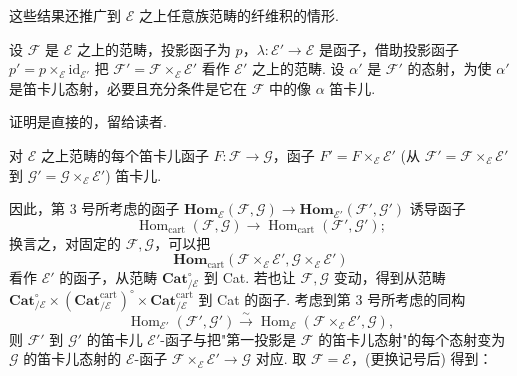 这些结果还推广到 $\mathcal{E}$ 之上任意族范畴的纤维积的情形.

\begin{proposition}\label{prop:VI.6.6}
设 $\mathcal{F}$ 是 $\mathcal{E}$ 之上的范畴，投影函子为 $p$，$\lambda \colon \mathcal{E}' \to \mathcal{E}$ 是函子，借助投影函子 $p' = p \times_{\mathcal{E}} \mathrm{id}_{\mathcal{E}'}$ 把 $\mathcal{F}' = \mathcal{F} \times_{\mathcal{E}} \mathcal{E}'$ 看作 $\mathcal{E}'$ 之上的范畴. 设 $\alpha'$ 是 $\mathcal{F}'$ 的态射，为使 $\alpha'$ 是笛卡儿态射，必要且充分条件是它在 $\mathcal{F}$ 中的像 $\alpha$ 笛卡儿.
\end{proposition}

证明是直接的，留给读者.

\begin{corollary}\label{cor:VI.6.7}
对 $\mathcal{E}$ 之上范畴的每个笛卡儿函子 $F \colon \mathcal{F} \to \mathcal{G}$，函子 $F' = F \times_{\mathcal{E}} \mathcal{E}'$ (从 $\mathcal{F}' = \mathcal{F} \times_{\mathcal{E}} \mathcal{E}'$ 到 $\mathcal{G}' = \mathcal{G} \times_{\mathcal{E}} \mathcal{E}'$) 笛卡儿.
\end{corollary}

因此，第 3 号所考虑的函子 $\mathbf{Hom}_{\mathcal{E}}(\mathcal{F}, \mathcal{G}) \to \mathbf{Hom}_{\mathcal{E}'}(\mathcal{F}', \mathcal{G}')$ 诱导函子
\[
\operatorname{Hom}_{\mathrm{cart}}(\mathcal{F}, \mathcal{G}) \longrightarrow \operatorname{Hom}_{\mathrm{cart}}(\mathcal{F}', \mathcal{G}');
\]
换言之，对固定的 $\mathcal{F}, \mathcal{G}$，可以把
\[
\mathbf{Hom}_{\mathrm{cart}}(\mathcal{F} \times_{\mathcal{E}} \mathcal{E}', \mathcal{G} \times_{\mathcal{E}} \mathcal{E}')
\]
看作 $\mathcal{E}'$ 的函子，从范畴 $\mathbf{Cat}_{/\mathcal{E}}^{\circ}$ 到 Cat. 若也让 $\mathcal{F}, \mathcal{G}$ 变动，得到从范畴 $\mathbf{Cat}_{/\mathcal{E}}^{\circ} \times (\mathbf{Cat}_{/\mathcal{E}}^{\mathrm{cart}})^{\circ} \times \mathbf{Cat}_{/\mathcal{E}}^{\mathrm{cart}}$ 到 Cat 的函子. 考虑到第 3 号所考虑的同构
\[
\operatorname{Hom}_{\mathcal{E}'}(\mathcal{F}', \mathcal{G}') \stackrel{\sim}{\longrightarrow} \operatorname{Hom}_{\mathcal{E}}(\mathcal{F} \times_{\mathcal{E}} \mathcal{E}', \mathcal{G}),
\]
则 $\mathcal{F}'$ 到 $\mathcal{G}'$ 的笛卡儿 $\mathcal{E}'$-函子与把"第一投影是 $\mathcal{F}$ 的笛卡儿态射"的每个态射变为 $\mathcal{G}$ 的笛卡儿态射的 $\mathcal{E}$-函子 $\mathcal{F} \times_{\mathcal{E}} \mathcal{E}' \to \mathcal{G}$ 对应. 取 $\mathcal{F} = \mathcal{E}$，(更换记号后) 得到：

